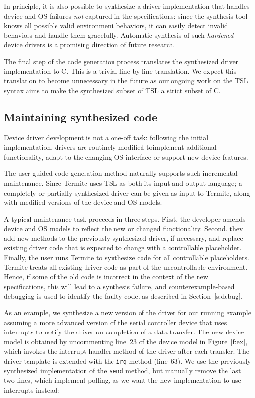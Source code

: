 \documentclass[a4paper,twoside,openright,11pt]{book}
\newcommand{\termite}{Termite\xspace}
\newcommand{\tsl}{TSL\xspace}
\theoremstyle{definition}
\newcommand{\src}[1]{\texttt{\small #1}}
\begin{document}
In principle, it is also possible to synthesize a driver implementation that handles device and OS failures \emph{not} captured in the specifications: since the synthesis tool knows all possible valid environment behaviors, it can easily detect invalid behaviors and handle them gracefully.  Automatic synthesis of such \emph{hardened} device drivers is a promising direction of future research.

The final step of the code generation process translates the synthesized driver implementation to C.  This is a trivial line-by-line translation.  We expect this translation to become unnecessary in the future as our ongoing work on the \tsl syntax aims to make the synthesized subset of \tsl a strict subset of C.

\subsection{Maintaining synthesized code~~} 
Device driver development is not a one-off task: following the initial implementation, drivers are routinely modified toimplement additional functionality, adapt to the changing OS interface or support new device features.

The user-guided code generation method naturally supports such incremental maintenance. Since \termite uses \tsl as both its input and output language;  a completely or partially synthesized driver can be given as input to \termite, along with modified versions of the device and OS models.

A typical maintenance task proceeds in three steps.  First, the developer amends device and OS models to reflect the new or changed functionality.  Second, they add new methods to the previously synthesized driver, if necessary, and replace existing driver code that is expected to change with a controllable  placeholder.  Finally, the user runs \termite to synthesize code for all controllable placeholders.  \termite treats all existing driver code as part of the uncontrollable environment.  Hence, if some of the old code is incorrect in the context of the new specifications, this will lead to a synthesis failure, and counterexample-based debugging is used to identify the faulty code, as described in Section~\ref{s:debug}.

As an example, we synthesize a new version of the driver for our running example assuming a more advanced version of the serial controller device that uses interrupts to notify the driver on completion of a data transfer.  The new device model is obtained by uncommenting line~23 of the device model in Figure~\ref{f:ex}, which invokes the interrupt handler method of the driver after each transfer.  The driver template is extended with the \src{irq} method (line~63).  We use the previously synthesized implementation of the \src{send} method, but manually remove the last two lines, which implement polling, as we want the new implementation to use interrupts instead:
\end{document}
